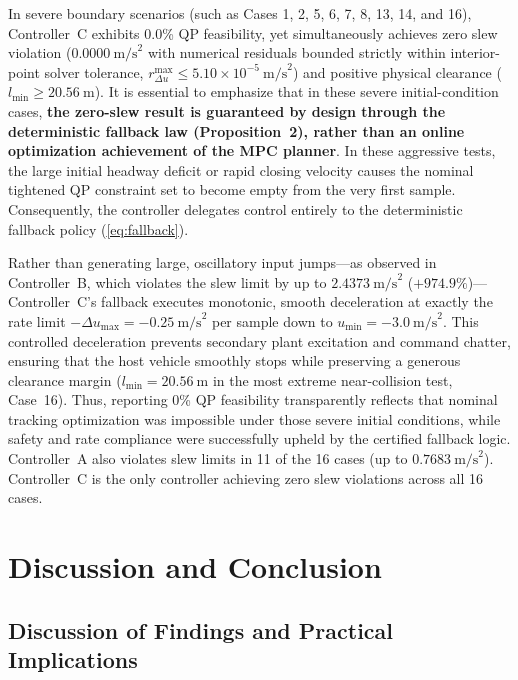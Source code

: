 \documentclass[journal]{IEEEtran}
\begin{document}
In severe boundary scenarios (such as Cases 1, 2, 5, 6, 7, 8, 13, 14, and 16), Controller~C exhibits 0.0\% QP feasibility, yet simultaneously achieves zero slew violation ($0.0000~\text{m/s}^2$ with numerical residuals bounded strictly within interior-point solver tolerance, $r_{\Delta u}^{\max} \le 5.10 \times 10^{-5}~\text{m/s}^2$) and positive physical clearance ($l_{\min} \ge 20.56~\text{m}$). It is essential to emphasize that in these severe initial-condition cases, \textbf{the zero-slew result is guaranteed by design through the deterministic fallback law (Proposition~2), rather than an online optimization achievement of the MPC planner}. In these aggressive tests, the large initial headway deficit or rapid closing velocity causes the nominal tightened QP constraint set to become empty from the very first sample. Consequently, the controller delegates control entirely to the deterministic fallback policy (\ref{eq:fallback}).

Rather than generating large, oscillatory input jumps—as observed in Controller~B, which violates the slew limit by up to $2.4373~\text{m/s}^2$ ($+974.9\%$)—Controller~C's fallback executes monotonic, smooth deceleration at exactly the rate limit $-\Delta u_{\max} = -0.25~\text{m/s}^2$ per sample down to $u_{\min} = -3.0~\text{m/s}^2$. This controlled deceleration prevents secondary plant excitation and command chatter, ensuring that the host vehicle smoothly stops while preserving a generous clearance margin ($l_{\min} = 20.56~\text{m}$ in the most extreme near-collision test, Case~16). Thus, reporting 0\% QP feasibility transparently reflects that nominal tracking optimization was impossible under those severe initial conditions, while safety and rate compliance were successfully upheld by the certified fallback logic. Controller~A also violates slew limits in 11 of the 16 cases (up to $0.7683~\text{m/s}^2$). Controller~C is the only controller achieving zero slew violations across all 16 cases.

\section{Discussion and Conclusion}

\subsection{Discussion of Findings and Practical Implications}
\end{document}
